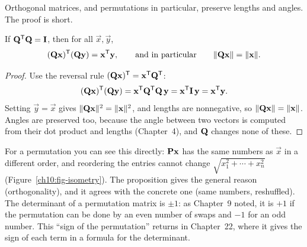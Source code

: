 Orthogonal matrices, and permutations in particular, preserve lengths and angles. The proof is
short.

\begin{proposition}\label{ch10:prop-isometry}
If $\mathbf{Q}^{\mathsf{T}}\mathbf{Q}=\mathbf{I}$, then for all $\vec{x},\vec{y}$,
\[
  (\mathbf{Q}\mathbf{x})^{\mathsf{T}}(\mathbf{Q}\mathbf{y}) = \mathbf{x}^{\mathsf{T}}\mathbf{y},
  \qquad\text{and in particular}\qquad
  \lVert\mathbf{Q}\mathbf{x}\rVert = \lVert\mathbf{x}\rVert.
\]
\end{proposition}

\begin{proof}
Use the reversal rule $(\mathbf{Q}\mathbf{x})^{\mathsf{T}}=\mathbf{x}^{\mathsf{T}}\mathbf{Q}^{\mathsf{T}}$:
\[
  (\mathbf{Q}\mathbf{x})^{\mathsf{T}}(\mathbf{Q}\mathbf{y})
  = \mathbf{x}^{\mathsf{T}}\mathbf{Q}^{\mathsf{T}}\mathbf{Q}\,\mathbf{y}
  = \mathbf{x}^{\mathsf{T}}\mathbf{I}\,\mathbf{y}
  = \mathbf{x}^{\mathsf{T}}\mathbf{y}.
\]
Setting $\vec{y}=\vec{x}$ gives $\lVert\mathbf{Q}\mathbf{x}\rVert^2=\lVert\mathbf{x}\rVert^2$, and lengths are
nonnegative, so $\lVert\mathbf{Q}\mathbf{x}\rVert=\lVert\mathbf{x}\rVert$. Angles are preserved too, because the angle
between two vectors is computed from their dot product and lengths (Chapter~4), and $\mathbf{Q}$
changes none of these.
\end{proof}

For a permutation you can see this directly: $\mathbf{P}\mathbf{x}$ has the same numbers as $\vec{x}$
in a different order, and reordering the entries cannot change $\sqrt{x_1^2+\cdots+x_n^2}$
(Figure~\ref{ch10:fig-isometry}). The
proposition gives the general reason (orthogonality), and it agrees with the concrete one (same
numbers, reshuffled). The determinant of a permutation matrix is $\pm 1$: as Chapter~9 noted, it
is $+1$ if the permutation can be done by an even number of swaps and $-1$ for an odd number. This
``sign of the permutation'' returns in Chapter~22, where it gives the sign of each term in a formula for the determinant.


